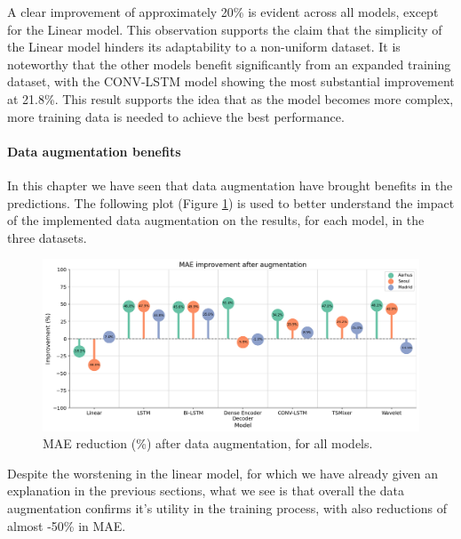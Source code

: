 A clear improvement of approximately 20\% is evident across all models, except for the Linear model. This observation supports the claim that the simplicity of the Linear model hinders its adaptability to a non-uniform dataset. It is noteworthy that the other models benefit significantly from an expanded training dataset, with the CONV-LSTM model showing the most substantial improvement at 21.8\%. This result supports the idea that as the model becomes more complex, more training data is needed to achieve the best performance.

\paragraph{Data augmentation benefits}

In this chapter we have seen that data augmentation have brought benefits in the predictions. The following plot (Figure \ref{fig:augmentation-improv}) is used to better understand the impact of the implemented data augmentation on the results, for each model, in the three datasets.

\begin{figure}[h]
    \centering
    \includegraphics[width=1\linewidth]{images/improvement with augmentation.png}
    \caption{MAE reduction (\%) after data augmentation, for all models.}
    \label{fig:augmentation-improv}
\end{figure}

Despite the worstening in the linear model, for which we have already given an explanation in the previous sections, what we see is that overall the data augmentation confirms it's utility in the training process, with also reductions of almost -50\% in MAE. 










